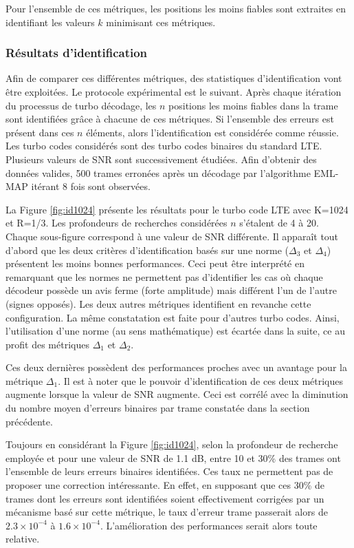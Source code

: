 Pour l'ensemble de ces métriques, les positions les moins fiables sont extraites en identifiant les valeurs $k$ minimisant
ces métriques.

\subsubsection{Résultats d'identification}
Afin de comparer ces différentes métriques, des statistiques d'identification vont être exploitées. Le protocole 
expérimental est le suivant. Après chaque itération du processus de turbo décodage, les $n$ positions les moins fiables
dans la trame sont identifiées grâce à chacune de ces métriques. Si l'ensemble des erreurs est présent dans ces $n$ éléments,
alors l'identification est considérée comme réussie. Les turbo codes considérés sont des turbo codes binaires du standard LTE.
Plusieurs valeurs de SNR sont successivement étudiées. Afin 
d'obtenir des données valides, 500 trames erronées après un décodage par l'algorithme EML-MAP itérant 8 fois sont
observées.

La Figure \ref{fig:id1024} présente les résultats pour le turbo code LTE avec K=1024 et R=1/3. Les profondeurs de recherches 
considérées $n$ s'étalent de 4 à 20. Chaque sous-figure correspond à une valeur de SNR différente. Il apparaît tout d'abord que 
les deux critères d'identification basés sur une norme ($\Delta_3$ et $\Delta_4$) présentent les moins bonnes performances.
 Ceci peut être interprété en remarquant que les normes ne permettent pas d'identifier les
cas où chaque décodeur possède un avis ferme (forte amplitude) mais différent l'un de l'autre (signes opposés). Les deux 
autres métriques identifient en revanche cette configuration. La même constatation est faite pour d'autres turbo codes. 
Ainsi, l'utilisation d'une norme (au sens mathématique) est écartée dans la suite, ce au profit des métriques $\Delta_1$ 
et $\Delta_2$.

Ces deux dernières possèdent des performances proches avec un avantage pour la métrique $\Delta_1$. Il est à noter que le pouvoir 
d'identification de ces deux métriques augmente lorsque la valeur de SNR augmente. Ceci est corrélé avec la diminution du 
nombre moyen d'erreurs binaires par trame constatée dans la section précédente.

Toujours en considérant la Figure \ref{fig:id1024}, selon la profondeur de recherche employée et pour une valeur de SNR 
de 1.1 dB, entre 10 et 30\% des trames ont l'ensemble de leurs erreurs binaires identifiées. Ces taux ne 
permettent pas de proposer une correction intéressante. En effet, en supposant que ces 30\% de trames dont les erreurs sont 
identifiées soient effectivement corrigées par un mécanisme basé sur cette métrique, le taux d'erreur trame passerait alors 
de $2.3\times 10^{-4}$ à $1.6\times 10^{-4}$. L'amélioration des performances serait alors toute relative.

